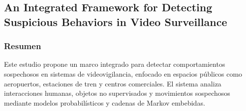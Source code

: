 \documentclass[listof=nochaptergap,12pt,times,authoryear]{report}
\begin{document}
\subsection{An Integrated Framework for Detecting Suspicious Behaviors in Video Surveillance}

\subsubsection{Resumen}
Este estudio propone un marco integrado para detectar comportamientos sospechosos en sistemas de videovigilancia, enfocado en espacios públicos como aeropuertos, estaciones de tren y centros comerciales. El sistema analiza interacciones humanas, objetos no supervisados y movimientos sospechosos mediante modelos probabilísticos y cadenas de Markov embebidas.
\end{document}
